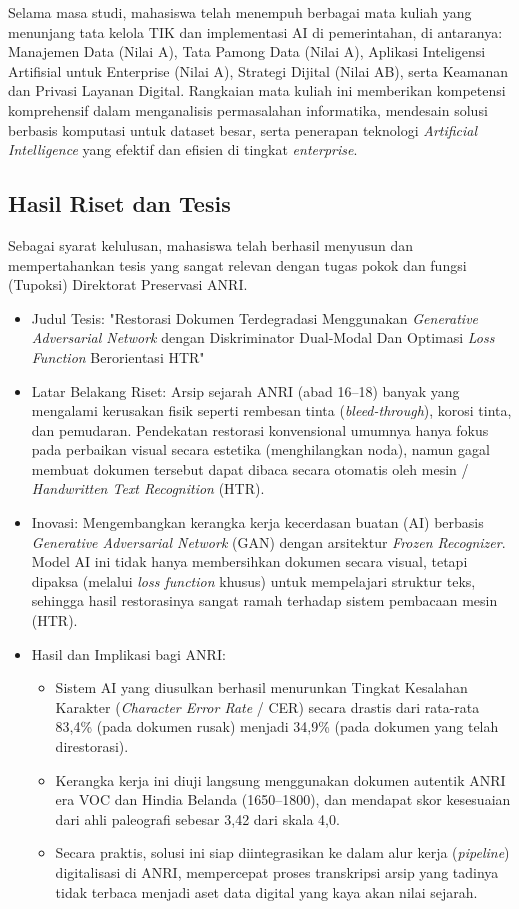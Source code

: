 \documentclass[11pt, a4paper]{article}
\begin{document}
Selama masa studi, mahasiswa telah menempuh berbagai mata kuliah yang menunjang tata kelola TIK dan implementasi AI di pemerintahan, di antaranya: Manajemen Data (Nilai A), Tata Pamong Data (Nilai A), Aplikasi Inteligensi Artifisial untuk Enterprise (Nilai A), Strategi Dijital (Nilai AB), serta Keamanan dan Privasi Layanan Digital. Rangkaian mata kuliah ini memberikan kompetensi komprehensif dalam menganalisis permasalahan informatika, mendesain solusi berbasis komputasi untuk dataset besar, serta penerapan teknologi \textit{Artificial Intelligence} yang efektif dan efisien di tingkat \textit{enterprise}.

\subsection{Hasil Riset dan Tesis}
Sebagai syarat kelulusan, mahasiswa telah berhasil menyusun dan mempertahankan tesis yang sangat relevan dengan tugas pokok dan fungsi (Tupoksi) Direktorat Preservasi ANRI. 

\begin{itemize}
    \item Judul Tesis: "Restorasi Dokumen Terdegradasi Menggunakan \textit{Generative Adversarial Network} dengan Diskriminator Dual-Modal Dan Optimasi \textit{Loss Function} Berorientasi HTR"
    \item Latar Belakang Riset: Arsip sejarah ANRI (abad 16--18) banyak yang mengalami kerusakan fisik seperti rembesan tinta (\textit{bleed-through}), korosi tinta, dan pemudaran. Pendekatan restorasi konvensional umumnya hanya fokus pada perbaikan visual secara estetika (menghilangkan noda), namun gagal membuat dokumen tersebut dapat dibaca secara otomatis oleh mesin / \textit{Handwritten Text Recognition} (HTR). 
    \item Inovasi: Mengembangkan kerangka kerja kecerdasan buatan (AI) berbasis \textit{Generative Adversarial Network} (GAN) dengan arsitektur \textit{Frozen Recognizer}. Model AI ini tidak hanya membersihkan dokumen secara visual, tetapi dipaksa (melalui \textit{loss function} khusus) untuk mempelajari struktur teks, sehingga hasil restorasinya sangat ramah terhadap sistem pembacaan mesin (HTR).
    \item Hasil dan Implikasi bagi ANRI:
    \begin{itemize}
        \item Sistem AI yang diusulkan berhasil menurunkan Tingkat Kesalahan Karakter (\textit{Character Error Rate} / CER) secara drastis dari rata-rata 83,4\% (pada dokumen rusak) menjadi 34,9\% (pada dokumen yang telah direstorasi). 
        \item Kerangka kerja ini diuji langsung menggunakan dokumen autentik ANRI era VOC dan Hindia Belanda (1650--1800), dan mendapat skor kesesuaian dari ahli paleografi sebesar 3,42 dari skala 4,0. 
        \item Secara praktis, solusi ini siap diintegrasikan ke dalam alur kerja (\textit{pipeline}) digitalisasi di ANRI, mempercepat proses transkripsi arsip yang tadinya tidak terbaca menjadi aset data digital yang kaya akan nilai sejarah.
    \end{itemize}
\end{itemize}
\end{document}
